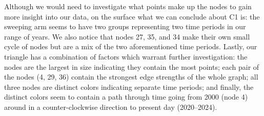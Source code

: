 \documentclass[
  10pt,
  letterpaper,
  DIV=11,
  numbers=noendperiod]{scrartcl}
\begin{document}
\begin{table}[H]


\caption{\label{tbl-Singleton_Summary}Singleton nodes and the years they
contain.}

\end{table}%

Although we would need to investigate what points make up the nodes to
gain more insight into our data, on the surface what we can conclude
about C1 is: the sweeping arm seems to have two groups representing two
time periods in our range of years. We also notice that nodes 27, 35,
and 34 make their own small cycle of nodes but are a mix of the two
aforementioned time periods. Lastly, our triangle has a combination of
factors which warrant further investigation: the nodes are the largest
in size indicating they contain the most points; each pair of the nodes
(4, 29, 36) contain the strongest edge strengths of the whole graph; all
three nodes are distinct colors indicating separate time periods; and
finally, the distinct colors seem to contain a path through time going
from 2000 (node 4) around in a counter-clockwise direction to present
day (2020--2024).
\end{document}
